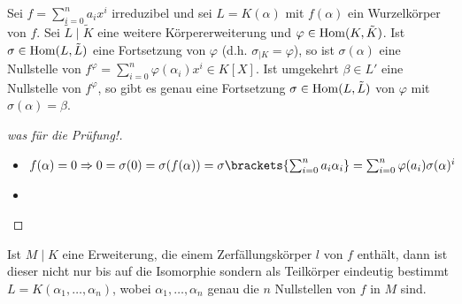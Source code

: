 \begin{lemma}
	Sei $f = \sum_{i=0}^n a_i x^i$ irreduzibel und sei $L = K(\alpha)$ mit $f(\alpha)$ ein Wurzelkörper von $f$. Sei $\tilde{L}\mid \tilde{K}$ eine weitere Körpererweiterung und $\varphi \in \operatorname{Hom}(K,\tilde{K})$. Ist $\sigma \in \operatorname{Hom}(L,\tilde{L})$ eine Fortsetzung von $\varphi$ (d.h. $\sigma_{\mid K} = \varphi$), so ist $\sigma(\alpha)$ eine Nullstelle von $f^{\varphi}=\sum_{i=0}^n \varphi(\alpha_i)x^i \in K[X]$. Ist umgekehrt $\beta \in L' $ eine Nullstelle von $f^{\varphi}$, so gibt es genau eine Fortsetzung $\sigma \in \operatorname{Hom}(L,\tilde{L})$ von $\varphi$ mit $\sigma(\alpha) = \beta$.
\end{lemma}
\begin{proof}[was für die Prüfung!]
	\begin{itemize}
		\item $f(\alpha) = 0 \Rightarrow 0 = \sigma(0) = \sigma(f(\alpha)) = \sigma\brackets{\sum_{i=0}^n a_i \alpha_i} = \sum_{i=0}^n \varphi(a_i)\sigma(\alpha)^i$
		\item 
	\end{itemize}
\end{proof}
\begin{remark}
	Ist $M\mid K$ eine Erweiterung, die einem Zerfällungskörper $l$ von $f$ enthält, dann ist dieser nicht nur bis auf die Isomorphie sondern als Teilkörper eindeutig bestimmt $L = K(\alpha_1, \dots, \alpha_n)$, wobei $\alpha_1, \dots, \alpha_n$ genau die $n$ Nullstellen von $f$ in $M$ sind.
\end{remark}
